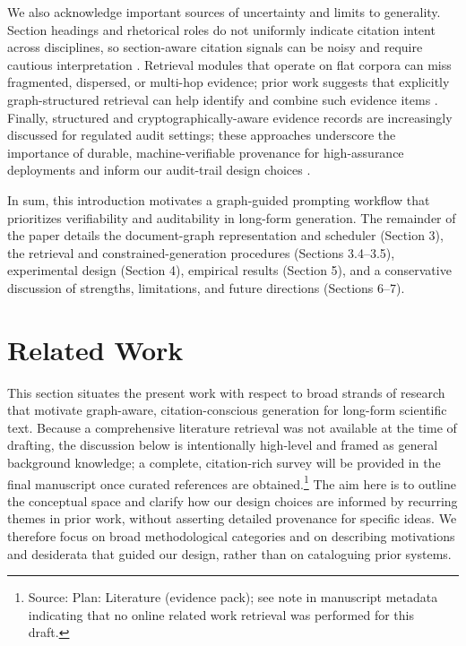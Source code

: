 \documentclass{article}%
\begin{document}
We also acknowledge important sources of uncertainty and limits to generality.
Section headings and rhetorical roles do not uniformly indicate citation intent across disciplines, so section-aware citation signals can be noisy and require cautious interpretation \cite{web_thelwall_2019_should_citations_be_counted_separately_from_each}.
Retrieval modules that operate on flat corpora can miss fragmented, dispersed, or multi-hop evidence; prior work suggests that explicitly graph-structured retrieval can help identify and combine such evidence items \cite{web_mongiov_2021_graph_based_retrieval_for_claim_verification_ove}.
Finally, structured and cryptographically-aware evidence records are increasingly discussed for regulated audit settings; these approaches underscore the importance of durable, machine-verifiable provenance for high-assurance deployments and inform our audit-trail design choices \cite{web_kao_2025_quantum_adversary_resilient_evidence_structures_}.

In sum, this introduction motivates a graph-guided prompting workflow that prioritizes verifiability and auditability in long-form generation.
The remainder of the paper details the document-graph representation and scheduler (Section 3), the retrieval and constrained-generation procedures (Sections 3.4–3.5), experimental design (Section 4), empirical results (Section 5), and a conservative discussion of strengths, limitations, and future directions (Sections 6–7).%

%
\section{Related Work}%


%
This section situates the present work with respect to broad strands of research that motivate graph-aware, citation-conscious generation for long-form scientific text. Because a comprehensive literature retrieval was not available at the time of drafting, the discussion below is intentionally high-level and framed as general background knowledge; a complete, citation-rich survey will be provided in the final manuscript once curated references are obtained.\footnote{Source: Plan: Literature (evidence pack); see note in manuscript metadata indicating that no online related work retrieval was performed for this draft.} The aim here is to outline the conceptual space and clarify how our design choices are informed by recurring themes in prior work, without asserting detailed provenance for specific ideas. We therefore focus on broad methodological categories and on describing motivations and desiderata that guided our design, rather than on cataloguing prior systems.
\end{document}

